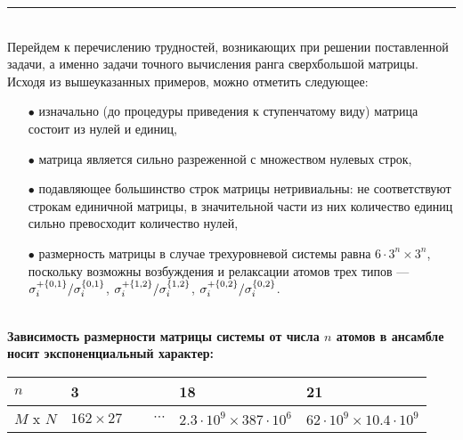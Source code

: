 \medskip\hrule\medskip
\
\\[12pt]
\noindent Перейдем к перечислению трудностей, возникающих при решении поставленной задачи, а именно задачи точного вычисления ранга сверхбольшой матрицы.\\Исходя из вышеуказанных примеров, можно отметить следующее:
\begin{itemize}
	\item[$\bullet$]{
		изначально (до процедуры приведения к ступенчатому виду) матрица состоит из нулей и единиц,}
	\item[$\bullet$]{
		матрица является сильно разреженной с множеством нулевых строк,}
	\item[$\bullet$]{
		подавляющее большинство строк матрицы нетривиальны: не соответствуют строкам единичной матрицы, в значительной части из них количество единиц сильно превосходит количество нулей,}
	\item[$\bullet$]{
		размерность матрицы в случае трехуровневой системы равна $6 \cdot 3^{n} \times 3^{n}$, поскольку возможны возбуждения и релаксации атомов трех типов --- $\sigma_{i}^{+\{0,1\}} / \sigma_{i}^{\{0,1\}}$, $\sigma_{i}^{+\{1,2\}} / \sigma_{i}^{\{1,2\}}$, $\sigma_{i}^{+\{0,2\}} / \sigma_{i}^{\{0,2\}}$.
	}
\end{itemize}
\
\\[0pt]
\noindent\textbf{Зависимость размерности матрицы системы от числа $n$ атомов в ансамбле носит экспоненциальный характер:}

\noindent\begin{tabular}[t]{|p{4em}|p{5em}|p{4em}|p{9em}|p{9em}|}
	\hline
	$n$ & 3 &  & 18 & 21 \\
	\hline
	$M$ x $N$ & $162 \times 27$ & $\quad~\cdots$ & $2.3 \cdot 10^9 \times 387 \cdot 10^6$ & $62 \cdot 10^9 \times 10.4 \cdot 10^9$ \\
	\hline
\end{tabular}
\
\\[12pt]

